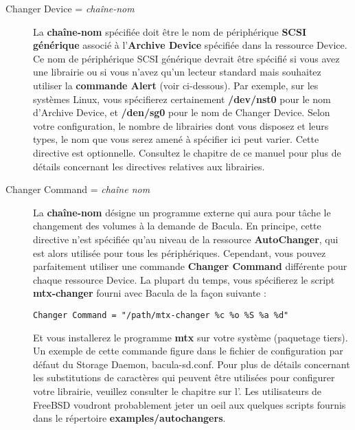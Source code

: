 \begin{description}
\item [Changer Device = {\it cha\^ine-nom}]
   La {\bf cha\^ine-nom} sp\'ecifi\'ee doit \^etre le nom de p\'eriph\'erique {\bf SCSI g\'en\'erique} 
   associ\'e \`a l'{\bf Archive Device} sp\'ecifi\'ee dans la ressource Device. Ce nom de 
   p\'eriph\'erique SCSI g\'en\'erique devrait \^etre sp\'ecifi\'e si vous avez une librairie 
   ou si vous n'avez qu'un lecteur standard mais souhaitez utiliser la {\bf commande 
   Alert} (voir ci-dessous). Par exemple, sur les syst\`emes Linux, vous sp\'ecifierez 
   certainement {\bf /dev/nst0} pour le nom d'Archive Device, et {\bf /den/sg0} pour 
   le nom de Changer Device. Selon votre configuration, le nombre de librairies dont 
   vous disposez et leurs types, le nom que vous serez amen\'e \`a sp\'ecifier ici peut varier. 
   Cette directive est optionnelle. Consultez le chapitre 
    de ce manuel pour plus de d\'etails 
   concernant les directives relatives aux librairies.

\item [Changer Command = {\it cha\^ine nom}]
   La {\bf cha\^ine-nom} d\'esigne un programme externe qui aura pour t\^ache le 
   changement des volumes \`a la demande de Bacula. En principe, cette directive 
   n'est sp\'ecifi\'ee qu'au niveau de la ressource {\bf AutoChanger}, qui est alors 
   utilis\'ee pour tous les p\'eriph\'eriques. Cependant, vous pouvez parfaitement 
   utiliser une commande {\bf Changer Command} diff\'erente pour chaque ressource Device. 
   La plupart du temps, vous sp\'ecifierez le script {\bf mtx-changer} fourni avec 
   Bacula de la fa\c {c}on suivante :

\footnotesize
\begin{verbatim}
Changer Command = "/path/mtx-changer %c %o %S %a %d"
\end{verbatim}
\normalsize

   Et vous installerez le programme {\bf mtx} sur votre syst\`eme (paquetage tiers). 
   Un exemple de cette commande figure dans le fichier de configuration par d\'efaut 
   du Storage Daemon, bacula-sd.conf. Pour plus de d\'etails concernant les 
   substitutions de caract\`eres qui peuvent \^etre utilis\'ees pour configurer 
   votre librairie, veuillez consulter le chapitre sur 
   l'. Les utilisateurs 
   de FreeBSD voudront probablement jeter un oeil aux quelques scripts 
   fournis dans le r\'epertoire {\bf examples/autochangers}.   


\end{description}
